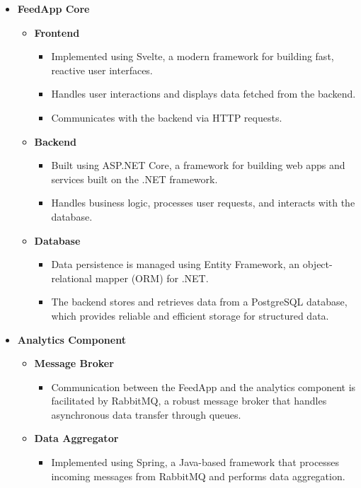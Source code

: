 \begin{itemize}
    \item \textbf{FeedApp Core}
    \begin{itemize}
        \item \textbf{Frontend}
        \begin{itemize}
            \item Implemented using Svelte, a modern framework for building fast, reactive user interfaces.
            \item Handles user interactions and displays data fetched from the backend.
            \item Communicates with the backend via HTTP requests.
        \end{itemize}
        \item \textbf{Backend}
        \begin{itemize}
            \item Built using ASP.NET Core, a framework for building web apps and services built on the .NET framework. 
            \item Handles business logic, processes user requests, and interacts with the database.
        \end{itemize}
        \item \textbf{Database}
        \begin{itemize}
            \item Data persistence is managed using Entity Framework, an object-relational mapper (ORM) for .NET.
            \item The backend stores and retrieves data from a PostgreSQL database, which provides reliable and efficient storage for structured data.
        \end{itemize}
    \end{itemize}
    \item \textbf{Analytics Component}
    \begin{itemize}
        \item \textbf{Message Broker}
        \begin{itemize}
            \item Communication between the FeedApp and the analytics component is facilitated by RabbitMQ, a robust message broker that handles asynchronous data transfer through queues.
        \end{itemize}
        \item \textbf{Data Aggregator}
        \begin{itemize}
            \item Implemented using Spring, a Java-based framework that processes incoming messages from RabbitMQ and performs data aggregation.

\end{itemize}
\end{itemize}
\end{itemize}
